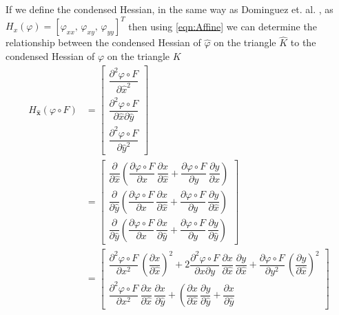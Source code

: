 If we define the condensed Hessian, in the same way as Dominguez et. al.
\cite{Dominguez08}, as $H_x(\varphi) = \left[ \varphi_{xx},\, \varphi_{xy},\,
\varphi_{yy}\right]^T$ then using \eqref{eqn:Affine} we can determine the
relationship between the condensed Hessian of $\hat{\varphi}$ on the triangle
$\hat{K}$ to the condensed Hessian of $\varphi$ on the triangle $K$
\begin{align*}
  H_{\mathbf{\hat{x}}}(\varphi\circ F) &= \begin{bmatrix}
    \dfrac{\partial^2 \varphi\circ F}{\partial \hat{x}^2} \\[1em]
    \dfrac{\partial^2 \varphi\circ F}{\partial \hat{x} \partial\hat{y}} \\[1em]
    \dfrac{\partial^2 \varphi\circ F}{\partial \hat{y}^2}
  \end{bmatrix} \\
  &= \begin{bmatrix}
    \dfrac{\partial}{\partial \hat{x}}\left( \dfrac{\partial \varphi\circ
      F}{\partial x}\, \dfrac{\partial x}{\partial \hat{x}} + \dfrac{\partial
      \varphi\circ F}{\partial y}\, \dfrac{\partial y}{\partial
      \hat{x}} \right) \\[1em]
    \dfrac{\partial}{\partial \hat{y}}\left( \dfrac{\partial \varphi\circ
      F}{\partial x}\, \dfrac{\partial x}{\partial \hat{x}} + \dfrac{\partial
      \varphi\circ F}{\partial y}\, \dfrac{\partial y}{\partial
      \hat{x}} \right) \\[1em]
    \dfrac{\partial}{\partial \hat{y}}\left( \dfrac{\partial \varphi\circ
      F}{\partial x}\, \dfrac{\partial x}{\partial \hat{y}} + \dfrac{\partial
      \varphi\circ F}{\partial y}\, \dfrac{\partial y}{\partial
      \hat{y}} \right)
  \end{bmatrix} \\
  &= \begin{bmatrix}
    \dfrac{\partial^2 \varphi\circ F}{\partial x^2}\, \left(\dfrac{\partial
      x}{\partial \hat{x}}\right)^2 + 2 \dfrac{\partial^2 \varphi\circ F}{\partial x
      \partial y} \, \dfrac{\partial x}{\partial \hat{x}} \,
      \dfrac{\partial y}{\partial \hat{x}} + \dfrac{\partial \varphi\circ
      F}{\partial y^2}\, \left(\dfrac{\partial y}{\partial \hat{x}}\right)^2 \\[1em]
    \dfrac{\partial^2 \varphi\circ F}{\partial x^2}\, \dfrac{\partial
      x}{\partial \hat{x}}\, \dfrac{\partial x}{\partial \hat{y}} + \left(
      \dfrac{\partial x}{\partial \hat{x}}\, \dfrac{\partial y}{\partial
      \hat{y}} + \dfrac{\partial x}{\partial \hat{y}}\,

\end{bmatrix}
\end{align*}
